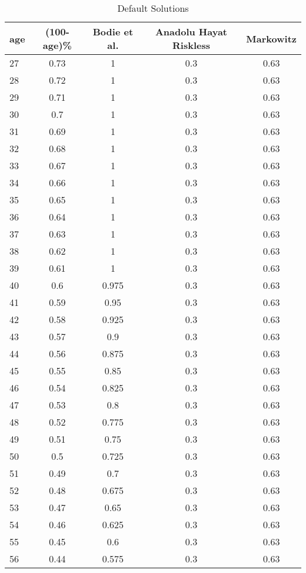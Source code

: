 \begin{table}
	\centering
	\caption[]{Default Solutions}
	\begin{tabular}[c]{lcccc}
		\hline
		age&(100-age)\%&Bodie et al.&Anadolu Hayat Riskless&Markowitz\\
		\hline
		27&0.73&1&0.3&0.63\\
		28&0.72&1&0.3&0.63\\
		29&0.71&1&0.3&0.63\\
		30&0.7&1&0.3&0.63\\
		31&0.69&1&0.3&0.63\\
		32&0.68&1&0.3&0.63\\
		33&0.67&1&0.3&0.63\\
		34&0.66&1&0.3&0.63\\
		35&0.65&1&0.3&0.63\\
		36&0.64&1&0.3&0.63\\
		37&0.63&1&0.3&0.63\\
		38&0.62&1&0.3&0.63\\
		39&0.61&1&0.3&0.63\\
		40&0.6&0.975&0.3&0.63\\
		41&0.59&0.95&0.3&0.63\\
		42&0.58&0.925&0.3&0.63\\
		43&0.57&0.9&0.3&0.63\\
		44&0.56&0.875&0.3&0.63\\
		45&0.55&0.85&0.3&0.63\\
		46&0.54&0.825&0.3&0.63\\
		47&0.53&0.8&0.3&0.63\\
		48&0.52&0.775&0.3&0.63\\
		49&0.51&0.75&0.3&0.63\\
		50&0.5&0.725&0.3&0.63\\
		51&0.49&0.7&0.3&0.63\\
		52&0.48&0.675&0.3&0.63\\
		53&0.47&0.65&0.3&0.63\\
		54&0.46&0.625&0.3&0.63\\
		55&0.45&0.6&0.3&0.63\\
		56&0.44&0.575&0.3&0.63\\
		\hline
	\end{tabular}
\end{table}


